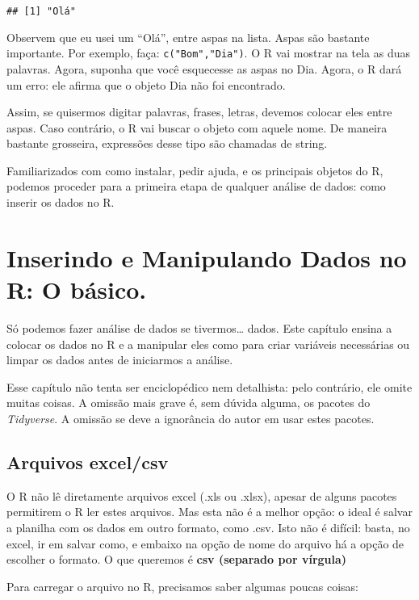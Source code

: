 \documentclass[]{book}
\begin{document}
\begin{verbatim}
## [1] "Olá"
\end{verbatim}

Observem que eu usei um ``Olá'', entre aspas na lista. Aspas são
bastante importante. Por exemplo, faça: \texttt{c("Bom","Dia")}. O R vai
mostrar na tela as duas palavras. Agora, suponha que você esquecesse as
aspas no Dia. Agora, o R dará um erro: ele afirma que o objeto Dia não
foi encontrado.

Assim, se quisermos digitar palavras, frases, letras, devemos colocar
eles entre aspas. Caso contrário, o R vai buscar o objeto com aquele
nome. De maneira bastante grosseira, expressões desse tipo são chamadas
de string.

Familiarizados com como instalar, pedir ajuda, e os principais objetos
do R, podemos proceder para a primeira etapa de qualquer análise de
dados: como inserir os dados no R.

\chapter{Inserindo e Manipulando Dados no R: O
básico.}\label{inserindo-e-manipulando-dados-no-r-o-basico.}

Só podemos fazer análise de dados se tivermos\ldots{} dados. Este
capítulo ensina a colocar os dados no R e a manipular eles como para
criar variáveis necessárias ou limpar os dados antes de iniciarmos a
análise.

Esse capítulo não tenta ser enciclopédico nem detalhista: pelo
contrário, ele omite muitas coisas. A omissão mais grave é, sem dúvida
alguma, os pacotes do \emph{Tidyverse}. A omissão se deve a ignorância
do autor em usar estes pacotes.

\section{Arquivos excel/csv}\label{arquivos-excelcsv}

O R não lê diretamente arquivos excel (.xls ou .xlsx), apesar de alguns
pacotes permitirem o R ler estes arquivos. Mas esta não é a melhor
opção: o ideal é salvar a planilha com os dados em outro formato, como
.csv. Isto não é difícil: basta, no excel, ir em salvar como, e embaixo
na opção de nome do arquivo há a opção de escolher o formato. O que
queremos é \textbf{csv (separado por vírgula)}

Para carregar o arquivo no R, precisamos saber algumas poucas coisas:
\end{document}
